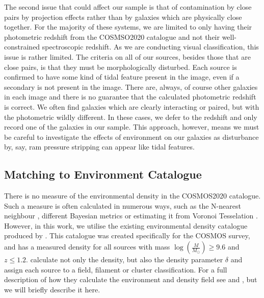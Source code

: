 The second issue that could affect our sample is that of contamination by close pairs by projection effects rather than by galaxies which are physically close together. For the majority of these systems, we are limited to only having their photometric redshift from the COSMSO2020 catalogue and not their well-constrained spectroscopic redshift. As we are conducting visual classification, this issue is rather limited. The criteria on all of our sources, besides those that are close pairs, is that they must be morphologically disturbed. Each source is confirmed to have some kind of tidal feature present in the image, even if a secondary is not present in the image. There are, always, of course other galaxies in each image and there is no guarantee that the calculated photometric redshift is correct. We often find galaxies which are clearly interacting or paired, but with the photometric wildly different. In these cases, we defer to the redshift and only record one of the galaxies in our sample. This approach, however, means we must be careful to investigate the effects of environment on our galaxies as disturbance by, say, ram pressure stripping can appear like tidal features.

\subsection{Matching to Environment Catalogue}\label{data:environ}
\noindent There is no measure of the environmental density in the COSMOS2020 catalogue. Such a measure is often calculated in numerous ways, such as the N-nearest neighbour \citep{2006MNRAS.373..469B}, different Bayesian metrics \citep{2008ApJ...674L..13C} or estimating it from Voronoi Tesselation \citep{2021inas.book...57V}. However, in this work, we utilise the existing environmental density catalogue produced by \citet{2017ApJ...837...16D}. This catalogue was created specifically for the COSMOS survey, and has a measured density for all sources with mass $\log(\frac{M}{M_\odot}) \geq 9.6$ and $z \leq 1.2$. \citet{2017ApJ...837...16D} calculate not only the density, but also the density parameter $\delta$ and assign each source to a field, filament or cluster classification. For a full description of how they calculate the environment and density field see \citet{2015ApJ...805..121D} and \citet{2017ApJ...837...16D}, but we will briefly describe it here.

